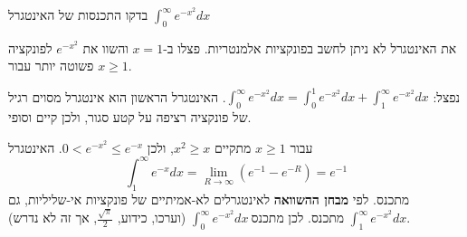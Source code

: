 
\begin{question}
בדקו התכנסות של האינטגרל $\displaystyle\int_0^\infty e^{-x^2}dx$
\end{question}

\begin{hint}
את האינטגרל לא ניתן לחשב בפונקציות אלמנטריות. פצלו ב-$x=1$ והשוו את $e^{-x^2}$ לפונקציה פשוטה יותר עבור $x\ge1$.
\end{hint}

\begin{solution}
נפצל: $\int_0^\infty e^{-x^2}dx=\int_0^1 e^{-x^2}dx+\int_1^\infty e^{-x^2}dx$.
האינטגרל הראשון הוא אינטגרל מסוים רגיל של פונקציה רציפה על קטע סגור, ולכן קיים וסופי.

עבור $x\ge 1$ מתקיים $x^2\ge x$, ולכן $0<e^{-x^2}\le e^{-x}$. האינטגרל
\[ \int_1^\infty e^{-x}dx=\lim_{R\to\infty}\left(e^{-1}-e^{-R}\right)=e^{-1} \]
מתכנס. לפי \textbf{מבחן ההשוואה} לאינטגרלים לא-אמיתיים של פונקציות אי-שליליות, גם $\int_1^\infty e^{-x^2}dx$ מתכנס. לכן $\boxed{\int_0^\infty e^{-x^2}dx\ \text{מתכנס}}$
(וערכו, כידוע, $\frac{\sqrt\pi}{2}$, אך זה לא נדרש).
\end{solution}
